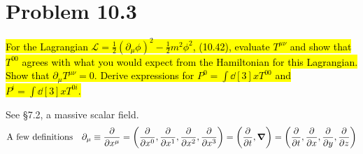 \documentclass{article}
\begin{document}
\section*{Problem 10.3}
\begin{quoting}
  \hl{For the Lagrangian $\mathcal{L}=\frac{1}{2}(\partial_\mu \phi)^2-\frac{1}{2}m^2\phi^2$, (10.42), evaluate $T^{\mu\nu}$ and show that $T^{00}$ agrees with what you would expect from the Hamiltonian for this Lagrangian. Show that $\partial_\mu T^{\mu\nu}=0$. Derive expressions for $P^0=\int\dd[3]{x}T^{00}$ and $P^i=\int\dd[3]{x}T^{0i}$.}
\end{quoting}
See \S 7.2, a massive scalar field.
\begin{align*}
  \qq*{A few definitions}\partial_\mu\equiv\pdv{x^\mu}=\pqty{\pdv{x^0},\pdv{x^1},\pdv{x^2},\pdv{x^3}}=\pqty{\pdv{t},\grad}=\pqty{\pdv{t},\pdv{x},\pdv{y},\pdv{z}}
\end{align*}
\end{document}
